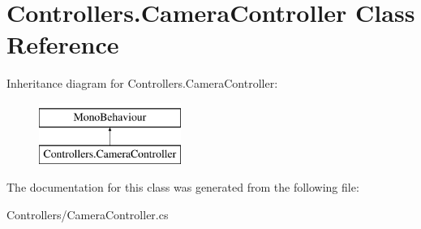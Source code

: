 \hypertarget{class_controllers_1_1_camera_controller}{}\section{Controllers.\+Camera\+Controller Class Reference}
\label{class_controllers_1_1_camera_controller}
Inheritance diagram for Controllers.\+Camera\+Controller\+:\begin{figure}[H]
\begin{center}
\leavevmode
\includegraphics[height=2.000000cm]{class_controllers_1_1_camera_controller}
\end{center}
\end{figure}


The documentation for this class was generated from the following file\+:\begin{DoxyCompactItemize}
\item 
Controllers/Camera\+Controller.\+cs\end{DoxyCompactItemize}
